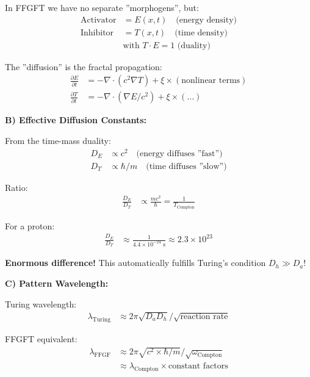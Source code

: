 \documentclass[12pt,a4paper]{article}
\begin{document}
	In FFGFT we have no separate ''morphogens'', but:
	\begin{align*}
		\text{Activator} &= E(x,t) \quad \text{(energy density)} \\
		\text{Inhibitor} &= T(x,t) \quad \text{(time density)} \\
		&\text{with } T \cdot E = 1 \text{ (duality)}
	\end{align*}
	
	The ''diffusion'' is the fractal propagation:
	\begin{align*}
		\frac{\partial E}{\partial t} &= -\nabla \cdot (c^2 \nabla T) + \xi \times (\text{nonlinear terms}) \\
		\frac{\partial T}{\partial t} &= -\nabla \cdot (\nabla E/c^2) + \xi \times (\dots)
	\end{align*}
	
	\textbf{B) Effective Diffusion Constants:}
	
	From the time-mass duality:
	\begin{align*}
		D_E &\propto c^2 \quad \text{(energy diffuses ''fast'')} \\
		D_T &\propto \hbar/m \quad \text{(time diffuses ''slow'')}
	\end{align*}
	
	Ratio:
	\begin{align*}
		\frac{D_E}{D_T} &\propto \frac{m c^2}{\hbar} = \frac{1}{T_{\text{Compton}}}
	\end{align*}
	
	For a proton:
	\begin{align*}
		\frac{D_E}{D_T} &\approx \frac{1}{4.4 \times 10^{-24} \text{ s}} \approx 2.3 \times 10^{23}
	\end{align*}
	
	\textbf{Enormous difference!} This automatically fulfills Turing's condition $D_h \gg D_a$!
	
	\textbf{C) Pattern Wavelength:}
	
	Turing wavelength:
	\begin{align*}
		\lambda_{\text{Turing}} &\approx 2\pi \sqrt{D_a D_h} / \sqrt{\text{reaction rate}}
	\end{align*}
	
	FFGFT equivalent:
	\begin{align*}
		\lambda_{\text{FFGF}} &\approx 2\pi \sqrt{c^2 \times \hbar/m} / \sqrt{\omega_{\text{Compton}}} \\
		&\approx \lambda_{\text{Compton}} \times \text{constant factors}
	\end{align*}
	
\end{document}
